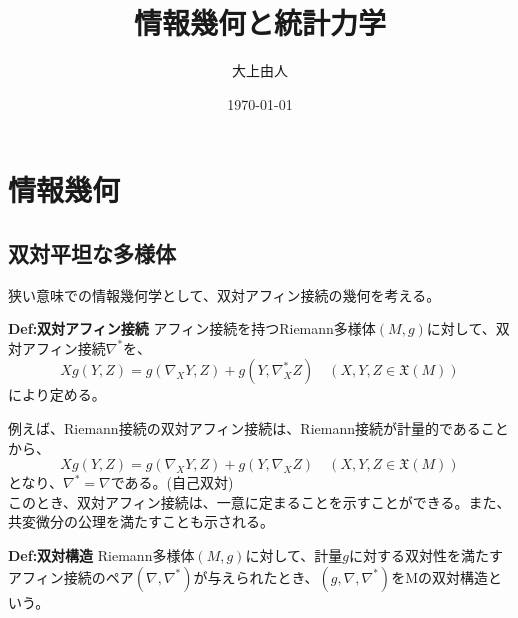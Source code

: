 \documentclass[a4paper,11pt]{jsarticle}
\numberwithin{equation}{section}
\begin{document}
\title{情報幾何と統計力学}
\author{大上由人}
\date{\today}
\maketitle

\section{情報幾何}
\subsection{双対平坦な多様体}
狭い意味での情報幾何学として、双対アフィン接続の幾何を考える。\\

\begin{itembox}[l]{\textbf{Def:双対アフィン接続}}
    アフィン接続を持つRiemann多様体$(M,g)$に対して、双対アフィン接続$\nabla ^*$を、
    \begin{equation}
        Xg(Y,Z) = g(\nabla_X Y,Z) + g(Y,\nabla^*_X Z) \quad (X,Y,Z \in \mathfrak{X}(M))
    \end{equation}
    により定める。
\end{itembox}
例えば、Riemann接続の双対アフィン接続は、Riemann接続が計量的であることから、
\begin{equation}
    Xg(Y, Z) = g(\nabla_X Y, Z) + g(Y, \nabla_X Z) \quad (X, Y, Z \in \mathfrak{X}(M))
\end{equation}
となり、$\nabla^* = \nabla$である。(自己双対)\\
このとき、双対アフィン接続は、一意に定まることを示すことができる。また、共変微分の公理を満たすことも示される。\\

\begin{itembox}[l]{\textbf{Def:双対構造}}
    Riemann多様体$(M,g)$に対して、計量$g$に対する双対性を満たすアフィン接続のペア$(\nabla,\nabla^*)$が与えられたとき、$(g,\nabla,\nabla^*)$をMの双対構造という。
\end{itembox}
\end{document}
